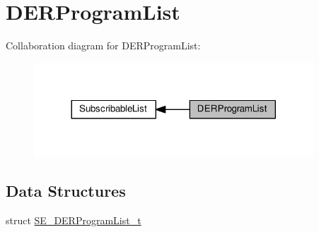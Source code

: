 \hypertarget{group__DERProgramList}{}\section{D\+E\+R\+Program\+List}
\label{group__DERProgramList}
Collaboration diagram for D\+E\+R\+Program\+List\+:\nopagebreak
\begin{figure}[H]
\begin{center}
\leavevmode
\includegraphics[width=296pt]{group__DERProgramList}
\end{center}
\end{figure}
\subsection*{Data Structures}
\begin{DoxyCompactItemize}
\item 
struct \hyperlink{structSE__DERProgramList__t}{S\+E\+\_\+\+D\+E\+R\+Program\+List\+\_\+t}
\end{DoxyCompactItemize}
